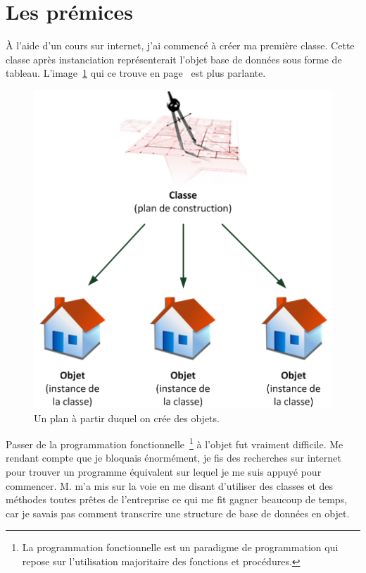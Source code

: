 \section{Les prémices} %
\label{sec:Les prémices}

À l'aide d'un cours sur internet, j'ai commencé à créer ma première classe.
Cette classe après instanciation représenterait l'objet \og base de données
\fg{} sous forme de tableau. L'image~\ref{obj} qui ce trouve en
page~\pageref{obj} est plus parlante.

\begin{figure}
\begin{center}
\includegraphics[scale=0.7]{images/objet.png}
\end{center}
\caption{Un plan à partir duquel on crée des objets.}
\label{obj}
\end{figure}

Passer de la programmation fonctionnelle\, \footnote{La programmation
fonctionnelle est un paradigme de programmation qui repose sur l'utilisation
majoritaire des fonctions et procédures.} à l'objet fut vraiment difficile. Me
rendant compte que je bloquais énormément, je fis des recherches sur internet
pour trouver un programme équivalent sur lequel je me suis appuyé pour
commencer. M. m'a mis sur la voie en me disant d'utiliser des
classes et des méthodes toutes prêtes de l'entreprise ce qui me fit gagner
beaucoup de temps, car je savais pas comment transcrire une structure de base
de données en objet.

